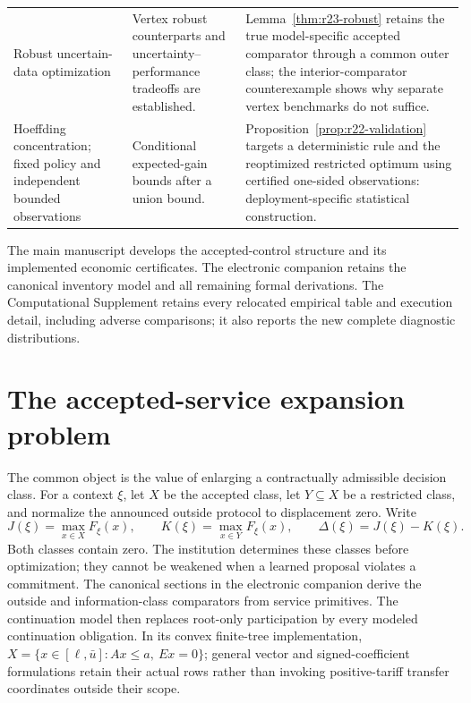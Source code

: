 \documentclass[11pt,letterpaper]{article}
\theoremstyle{definition}
\newcommand{\1}{\mathbf 1}
\begin{document}
\begin{table}[tbp]
\begin{tabular}{p{}p{}p{}}
Robust uncertain-data optimization \citep{BenTalNemirovski2000,BertsimasSim2004}
& Vertex robust counterparts and uncertainty--performance tradeoffs are established.
& Lemma~\ref{thm:r23-robust} retains the true model-specific accepted comparator through a common outer class; the interior-comparator counterexample shows why separate vertex benchmarks do not suffice.\\
Hoeffding concentration; fixed policy and independent bounded observations \citep{Hoeffding1963}
& Conditional expected-gain bounds after a union bound.
& Proposition~\ref{prop:r22-validation} targets a deterministic rule and the reoptimized restricted optimum using certified one-sided observations: deployment-specific statistical construction.\\
\bottomrule
\end{tabular}
\end{table}

The main manuscript develops the accepted-control structure and its implemented economic certificates. The electronic companion retains the canonical inventory model and all remaining formal derivations. The Computational Supplement retains every relocated empirical table and execution detail, including adverse comparisons; it also reports the new complete diagnostic distributions.

\section{The accepted-service expansion problem}\label{sec:r22-early}
The common object is the value of enlarging a contractually admissible decision class. For a context $\xi$, let $X$ be the accepted class, let $Y\subseteq X$ be a restricted class, and normalize the announced outside protocol to displacement zero. Write
\begin{equation}\label{eq:r22-common}
 J(\xi)=\max_{x\in X}F_\xi(x),\qquad
 K(\xi)=\max_{x\in Y}F_\xi(x),\qquad
 \Delta(\xi)=J(\xi)-K(\xi).
\end{equation}
Both classes contain zero. The institution determines these classes before optimization; they cannot be weakened when a learned proposal violates a commitment. The canonical sections in the electronic companion derive the outside and information-class comparators from service primitives. The continuation model then replaces root-only participation by every modeled continuation obligation. In its convex finite-tree implementation,
$X=\{x\in[\ell,\bar u]:Ax\leq a,\ Ex=0\}$; general vector and signed-coefficient formulations retain their actual rows rather than invoking positive-tariff transfer coordinates outside their scope.
\end{document}

